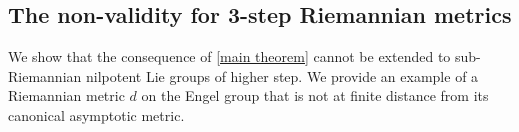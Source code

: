 \documentclass[a4paper,11pt,reqno]{amsart}
\theoremstyle{plain}
\theoremstyle{definition}
\newcommand{\R}{\mathbb R}
\newcommand{\N}{\mathbb N}
\renewcommand{\H}{\mathbb H}
\newcommand{\g}{\mathfrak{g}}
\begin{document}


\subsection{The non-validity for 3-step Riemannian metrics}

 We show that the consequence of \cref{main theorem} cannot be extended to sub-Riemannian nilpotent Lie groups of higher step. We provide an example of a Riemannian metric $d$ on the Engel group that is not at finite distance from its canonical asymptotic metric.
\end{document}
